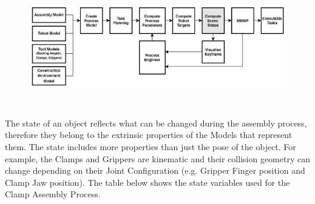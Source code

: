 \documentclass[11pt]{book}
\begin{document}
\begin{figure}[H]
\includegraphics[width=15.92cm,height=5.19cm]{./images/image36.jpeg}
\end{figure}


The state of an object reflects what can be changed during the assembly process, therefore they belong to the extrinsic properties of the Models that represent them. The state includes more properties than just the pose of the object. For example, the Clamps and Grippers are kinematic and their collision geometry can change depending on their Joint Configuration (e.g. Gripper Finger position and Clamp Jaw position). The table below shows the state variables used for the Clamp Assembly Process.
\end{document}
